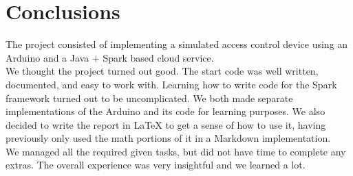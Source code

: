 \section{Conclusions }
The project consisted of implementing a simulated access control device using an Arduino and a Java + Spark based cloud service.\\

We thought the project turned out good. The start code was well written, documented, and easy to work with. Learning how to write code for the Spark framework turned out to be uncomplicated. We both made separate implementations of the Arduino and its code for learning purposes. We also decided to write the report in LaTeX to get a sense of how to use it, having previously only used the math portions of it in a Markdown implementation.\\
We managed all the required given tasks, but did not have time to complete any extras. The overall experience was very insightful and we learned a lot. 